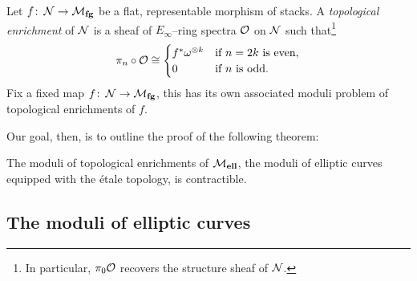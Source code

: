 \begin{definition}
Let \(f\colon\thinspace \mathcal{N} \to \mathcal{M}_{\mathbf{fg}}\) be a flat, representable morphism of stacks.  A \textit{topological enrichment} of \(\mathcal{N}\) is a sheaf of \(E_\infty\)--ring spectra \(\mathcal{O}\) on \(\mathcal{N}\) such that\footnote{In particular, \(\pi_0 \mathcal{O}\) recovers the structure sheaf of \(\mathcal{N}\).} \[\pi_n \circ \mathcal{O} \cong \begin{cases} f^* \omega^{\otimes k} & \text{if \(n = 2k\) is even}, \\ 0 & \text{if \(n\) is odd}. \end{cases}\]  Fix a fixed map \(f\colon\thinspace \mathcal{N} \to \mathcal{M}_{\mathbf{fg}}\), this has its own associated moduli problem of topological enrichments of \(f\).
\end{definition}

Our goal, then, is to outline the proof of the following theorem:

\begin{theorem}\label{UniqueTopEnrichmentOfMell}
The moduli of topological enrichments of \(\mathcal{M}_{\mathbf{ell}}\), the moduli of elliptic curves equipped with the \'etale topology, is contractible.
\end{theorem}



\subsection*{The moduli of elliptic curves}

